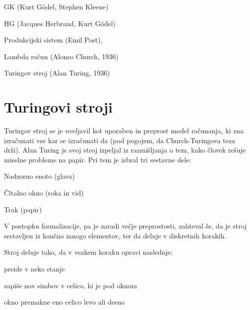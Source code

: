 \documentclass[10pt,a4paper,oneside]{book}
\begin{document}
\begin{items}
    \item GK (Kurt Gödel, Stephen Kleene) 
    \item HG (Jacques Herbrand, Kurt Gödel)
    \item Produkcijski sistem (Emil Post), %
    \item Lambda račun (Alonso Church, 1936)
    \item Turingov stroj (Alan Turing, 1936)
\end{items}

\pagebreak
\section{Turingovi stroji}
Turingov stroj se je uveljavil kot uporaben in preprost model računanja, ki zna izračunati vse kar se izračunati da (pod pogojem, da Church-Turingova teza drži). Alan Turing je svoj stroj izpeljal iz razmišljanja o tem, kako človek rešuje miselne probleme na papir. Pri tem je izbral tri sestavne dele:
\begin{items}
\item Nadzorno enoto (glava)
\item Čitalno okno (roka in vid)
\item Trak (papir)
\end{items}
V postopku formalizacije, pa je zaradi večje preprostosti, zahteval še, da je stroj sestavljen iz končno mnogo elementov, ter da deluje v diskretnih korakih.%


Stroj deluje tako, da v vsakem koraku opravi naslednje:
\begin{items}
	\item preide v neko stanje
	\item zapiše nov simbov v celico, ki je pod oknom
	\item okno premakne eno celico levo ali desno
\end{items}
\end{document}
